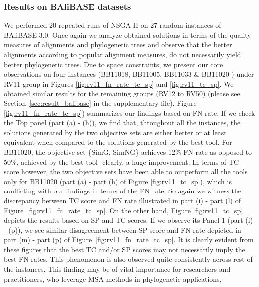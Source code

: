 \subsubsection{Results on BAliBASE datasets}
We performed 20 repeated runs of NSGA-II on 27 random instances of BAliBASE 3.0. Once again we analyze obtained solutions in terms of the quality measures of alignments and phylogenetic trees and observe that the better alignments according to popular alignment measures, do not necessarily yield better phylogenetic trees.
Due to space constraints, we present our core observations on four instances (BB11018, BB11005, BB11033 \& BB11020 ) under RV11 group in Figures \ref{fig:rv11_fn_rate_tc_sp} and \ref{fig:rv11_tc_sp}. We obtained similar results for the remaining groups (RV12 to RV50) (please see Section~\ref{sec:result_balibase} in the supplementary file). Figure \ref{fig:rv11_fn_rate_tc_sp}) summarizes our findings based on FN rate. If we check the Top panel (part (a) - (h)), we find that, throughout all the instances, the solutions generated by the two objective sets are either better or at least equivalent when compared to the solutions generated by the best tool.  
For BB11020, the objective set \{SimG, SimNG\} achieves 12\% FN rate as opposed to 50\%, achieved by the best tool- clearly, a huge improvement. In terms of TC score however, the two objective sets have been able to outperform all the tools only for BB11020 (part (a) - part (h) of Figure \ref{fig:rv11_tc_sp}), which is conflicting with our findings in terms of the FN rate. So again we witness the discrepancy between TC score and FN rate illustrated in part (i) - part (l) of Figure~\ref{fig:rv11_fn_rate_tc_sp}. On the other hand, Figure \ref{fig:rv11_tc_sp} depicts the results based on SP and TC scores. If we observe its Panel 1 (part (i) - (p)), we see similar disagreement between SP score and FN rate depicted in part (m) - part (p) of Figure~\ref{fig:rv11_fn_rate_tc_sp}. It is clearly evident from these figures that the best TC and/or SP scores may not necessarily imply the best FN rates. This phenomenon is also observed quite consistently across rest of the instances. This finding may be of vital importance for researchers and practitioners, who leverage MSA methods in phylogenetic applications, 

